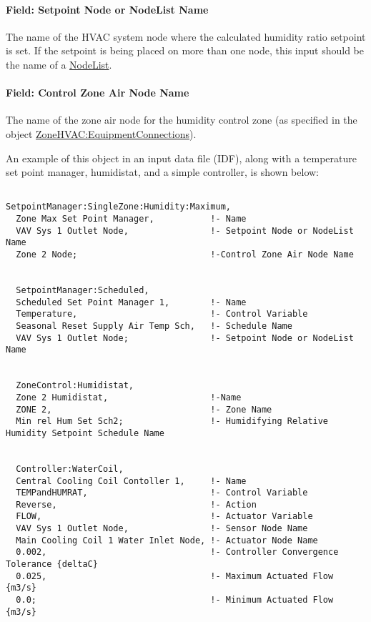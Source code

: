 \paragraph{Field: Setpoint Node or NodeList Name}\label{field-setpoint-node-or-nodelist-name-7}

The name of the HVAC system node where the calculated humidity ratio setpoint is set. If the setpoint is being placed on more than one node, this input should be the name of a \hyperref[nodelist]{NodeList}.

\paragraph{Field: Control Zone Air Node Name}\label{field-control-zone-air-node-name-1}

The name of the zone air node for the humidity control zone (as specified in the object \hyperref[zonehvacequipmentconnections]{ZoneHVAC:EquipmentConnections}).

An example of this object in an input data file (IDF), along with a temperature set point manager, humidistat, and a simple controller, is shown below:

\begin{lstlisting}

SetpointManager:SingleZone:Humidity:Maximum,
  Zone Max Set Point Manager,           !- Name
  VAV Sys 1 Outlet Node,                !- Setpoint Node or NodeList Name
  Zone 2 Node;                          !-Control Zone Air Node Name


  SetpointManager:Scheduled,
  Scheduled Set Point Manager 1,        !- Name
  Temperature,                          !- Control Variable
  Seasonal Reset Supply Air Temp Sch,   !- Schedule Name
  VAV Sys 1 Outlet Node;                !- Setpoint Node or NodeList Name


  ZoneControl:Humidistat,
  Zone 2 Humidistat,                    !-Name
  ZONE 2,                               !- Zone Name
  Min rel Hum Set Sch2;                 !- Humidifying Relative Humidity Setpoint Schedule Name


  Controller:WaterCoil,
  Central Cooling Coil Contoller 1,     !- Name
  TEMPandHUMRAT,                        !- Control Variable
  Reverse,                              !- Action
  FLOW,                                 !- Actuator Variable
  VAV Sys 1 Outlet Node,                !- Sensor Node Name
  Main Cooling Coil 1 Water Inlet Node, !- Actuator Node Name
  0.002,                                !- Controller Convergence Tolerance {deltaC}
  0.025,                                !- Maximum Actuated Flow {m3/s}
  0.0;                                  !- Minimum Actuated Flow {m3/s}
\end{lstlisting}

